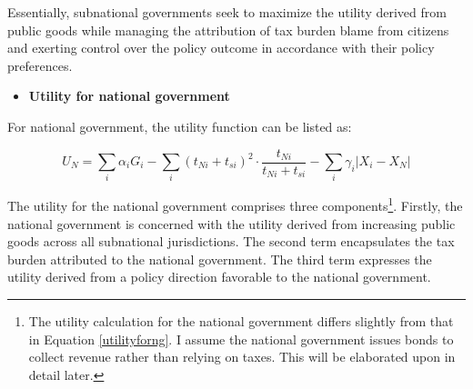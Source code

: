 \documentclass[man]{apa7}
\begin{document}

Essentially, subnational governments seek to maximize the utility derived from public goods while managing the attribution of tax burden blame from citizens and exerting control over the policy outcome in accordance with their policy preferences.

\begin{itemize}
  \item \textbf{Utility for national government}
\end{itemize}

For national government, the utility function can be listed as:

\begin{equation}
  U_N = \sum_i \alpha_i G_i - \sum_i (t_{Ni}+t_{si})^2\cdot \frac{t_{Ni}}{t_{Ni}+t_{si}} - \sum_i \gamma_i |X_i-X_N| \label{utilityforng}
\end{equation}


The utility for the national government comprises three components\footnote{The utility calculation for the national government differs slightly from that in Equation \ref{utilityforng}. I assume the national government issues bonds to collect revenue rather than relying on taxes. This will be elaborated upon in detail later.}.  Firstly, the national government is concerned with the utility derived from increasing public goods across all subnational jurisdictions. The second term encapsulates the tax burden attributed to the national government. The third term expresses the utility derived from a policy direction favorable to the national government.%
\end{document}
